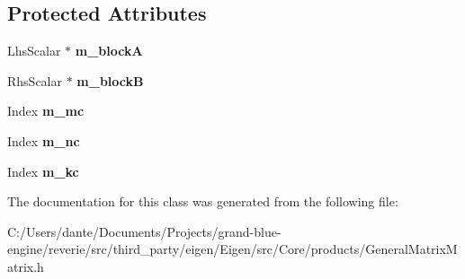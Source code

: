 \subsection*{Protected Attributes}
\begin{DoxyCompactItemize}
\item 
\mbox{\label{class_eigen_1_1internal_1_1level3__blocking_ae0ce462e06db4645ddec9edc30d716d5}} 
Lhs\+Scalar $\ast$ {\bfseries m\+\_\+blockA}
\item 
\mbox{\label{class_eigen_1_1internal_1_1level3__blocking_a715ed8be0a244d1728439f1222d421e3}} 
Rhs\+Scalar $\ast$ {\bfseries m\+\_\+blockB}
\item 
\mbox{\label{class_eigen_1_1internal_1_1level3__blocking_a56b854ed02249c5d48eb3b4beee7c0c8}} 
Index {\bfseries m\+\_\+mc}
\item 
\mbox{\label{class_eigen_1_1internal_1_1level3__blocking_ac550f8c780a0c2ce10fcfb543e3c4e7e}} 
Index {\bfseries m\+\_\+nc}
\item 
\mbox{\label{class_eigen_1_1internal_1_1level3__blocking_aa7355e9802478aaf77e95c08a05cadb8}} 
Index {\bfseries m\+\_\+kc}
\end{DoxyCompactItemize}


The documentation for this class was generated from the following file\+:\begin{DoxyCompactItemize}
\item 
C\+:/\+Users/dante/\+Documents/\+Projects/grand-\/blue-\/engine/reverie/src/third\+\_\+party/eigen/\+Eigen/src/\+Core/products/General\+Matrix\+Matrix.\+h\end{DoxyCompactItemize}
